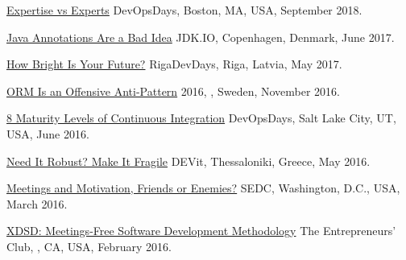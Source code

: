\documentclass{yb}
\begin{document}
\begin{samepage}
\href{https://youtu.be/KCx1o_lSMkI}{Expertise vs Experts}\newline
DevOpsDays, Boston, MA, USA, September 2018.
\end{samepage}

\begin{samepage}
\href{https://youtu.be/cv23Z6xpwDw}{Java Annotations Are a Bad Idea}\newline
JDK.IO, Copenhagen, Denmark, June 2017.
\end{samepage}

\begin{samepage}
\href{https://www.youtube.com/watch?v=IGbteQpTNCA}{How Bright Is Your Future?}\newline
RigaDevDays, Riga, Latvia, May 2017.
\end{samepage}

\begin{samepage}
\href{https://www.youtube.com/watch?v=03PXmPc7Q3g}{ORM Is an Offensive Anti-Pattern}\newline
{} 2016, , Sweden, November 2016.
\end{samepage}

\begin{samepage}
\href{https://www.youtube.com/watch?v=3dJP_LtUGgg}{8 Maturity Levels of Continuous Integration}\newline
DevOpsDays, Salt Lake City, UT, USA, June 2016.
\end{samepage}

\begin{samepage}
\href{https://www.youtube.com/watch?v=nCGBgI1MNwE}{Need It Robust? Make It Fragile}\newline
DEVit, Thessaloniki, Greece, May 2016.
\end{samepage}

\begin{samepage}
\href{https://www.youtube.com/watch?v=LB_YLWhGrco}{Meetings and Motivation, Friends or Enemies?}\newline
SEDC, Washington, D.C., USA, March 2016.
\end{samepage}

\begin{samepage}
\href{https://www.youtube.com/watch?v=qRZYJGYdrwk}{XDSD: Meetings-Free Software Development Methodology}\newline
The Entrepreneurs' Club, , CA, USA, February 2016.
\end{samepage}
\end{document}
